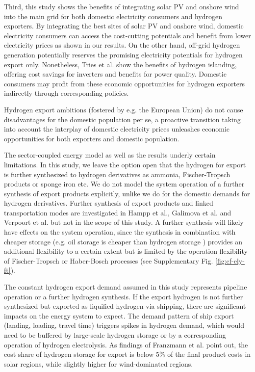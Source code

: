 \documentclass[5p,numafflabel]{elsarticle}
\begin{document}
Third, this study shows the benefits of integrating solar PV and onshore wind into the main grid for both domestic electricity consumers and hydrogen exporters. By integrating the best sites of solar PV and onshore wind, domestic electricity consumers can access the cost-cutting potentials and benefit from lower electricity prices as shown in our results. On the other hand, off-grid hydrogen generation potentially reserves the promising electricity potentials for hydrogen export only. Nonetheless, Tries et al.\cite{Tries2023b} show the benefits of hydrogen islanding, offering cost savings for inverters and benefits for power quality. Domestic consumers may profit from these economic opportunities for hydrogen exporters indirectly through corresponding policies.

Hydrogen export ambitions (fostered by e.g. the European Union) do not cause disadvantages for the domestic population per se, a proactive transition taking into account the interplay of domestic electricity prices unleashes economic opportunities for both exporters and domestic population.




The sector-coupled energy model as well as the results underly certain limitations. In this study, we leave the option open that the hydrogen for export is further synthesized to hydrogen derivatives as ammonia, Fischer-Tropsch products or sponge iron etc. We do not model the system operation of a further synthesis of export products explicitly, unlike we do for the domestic demands for hydrogen derivatives. Further synthesis of export products and linked transportation modes are investigated in Hampp et al.\cite{Hampp2023}, Galimova et al.\cite{Galimova2023} and Verpoort et al.\cite{Verpoort2023} but not in the scope of this study.
A further synthesis will likely have effects on the system operation, since the synthesis in combination with cheaper storage (e.g. oil storage is cheaper than hydrogen storage \cite{DEA2019TechnologyData}) provides an additional flexibility to a certain extent but is limited by the operation flexibility of Fischer-Tropsch or Haber-Bosch processes (see Supplementary Fig. \ref{fig:cf-ely-ft}).

The constant hydrogen export demand assumed in this study represents pipeline operation or a further hydrogen synthesis.
If the export hydrogen is not further synthesized but exported as liquified hydrogen via shipping, there are significant impacts on the energy system to expect. The demand pattern of ship export (landing, loading, travel time) triggers spikes in hydrogen demand, which would need to be buffered by large-scale hydrogen storage or by a corresponding operation of hydrogen electrolysis. As findings of Franzmann et al. \cite{Franzmann2023} point out, the cost share of hydrogen storage for export is below 5\% of the final product costs in solar regions, while slightly higher for wind-dominated regions.
\end{document}
